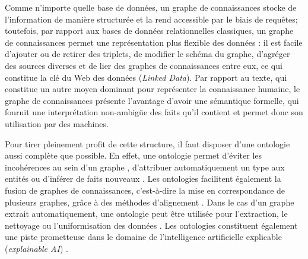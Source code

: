 Comme n'importe quelle base de données, un graphe de connaissances stocke de l'information de manière structurée et la rend accessible par le biais de requêtes; toutefois, par rapport aux bases de données relationnelles classiques, 
un graphe de connaissances permet une représentation plus flexible des données : il est facile d'ajouter ou de retirer des triplets, de modifier le schéma du graphe, d'agréger des sources diverses et de lier des graphes de connaissances entre eux, ce qui constitue la clé du Web des données (\textit{Linked Data}).
Par rapport au texte, qui constitue un autre moyen dominant pour représenter la connaissance humaine, le graphe de connaissances présente l'avantage d'avoir une sémantique formelle, qui fournit une interprétation non-ambigüe des faits qu'il contient et permet donc son utilisation par des machines.

Pour tirer pleinement profit de cette structure, il faut disposer d'une ontologie aussi complète que possible. %
%
En effet, une ontologie permet d'éviter les incohérences au sein d'un graphe \cite{inconsistencies2012dbpedia}, d'attribuer automatiquement un type aux entités \cite{typing2017kejriwal} ou d'inférer de faits nouveaux \cite{inference2015dinto}. Les ontologies facilitent également la fusion de graphes de connaissances, c'est-à-dire la mise en correspondance de plusieurs graphes, grâce à des méthodes d'alignement \cite{otero2015ontology}. Dans le cas d'un graphe extrait automatiquement, une ontologie peut être utilisée pour l'extraction, le nettoyage ou l'uniformisation des données \cite{webmining2011bhatia, webmining2014li}. Les ontologies constituent également une piste prometteuse dans le domaine de l'intelligence artificielle explicable (\textit{explainable AI}) \cite{explainable2018holzinger, explainable2019cardillo, explainable2019semantic}.

